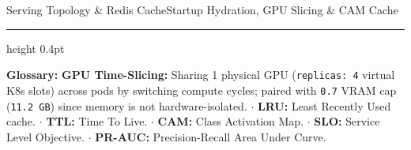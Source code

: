 \documentclass[aspectratio=169,10pt]{beamer}
\newcommand{\cueterms}[1]{%
    \vfill
    \vspace{2pt}
    {\color{SlateMid!35}\hrule height 0.4pt}
    \vspace{2pt}
    {\tiny\color{SlateMid!90}\textbf{Glossary:} #1}%
}
\begin{document}
\begin{frame}{Serving Topology \& Redis Cache}{Startup Hydration, GPU Slicing \& CAM Cache}
{\begin{itemize}
        \end{itemize}
        \cueterms{\textbf{GPU Time-Slicing:} Sharing 1 physical GPU (\texttt{replicas: 4} virtual K8s slots) across pods by switching compute cycles; paired with \texttt{0.7} VRAM cap (\texttt{11.2 GB}) since memory is not hardware-isolated. $\cdot$ \textbf{LRU:} Least Recently Used cache. $\cdot$ \textbf{TTL:} Time To Live. $\cdot$ \textbf{CAM:} Class Activation Map. $\cdot$ \textbf{SLO:} Service Level Objective. $\cdot$ \textbf{PR-AUC:} Precision-Recall Area Under Curve.}
    }
\end{frame}

\end{document}

